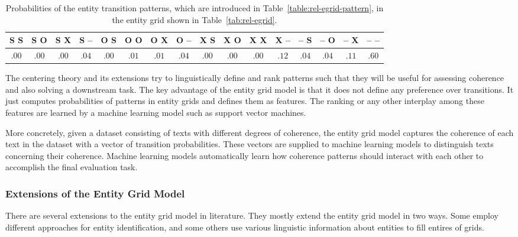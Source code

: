 \begin{table}
	\begin{center}
		\resizebox{\columnwidth}{!}
		{%
			\begin{tabular}{@{}cccccccccccccccc@{}}
				\toprule
				S S & S O & S X & S -- & O S & O O & O X & O -- & X S & X O & X X & X -- & -- S & -- O & -- X & -- -- \\
				\midrule
				$.00$ & $.00$ & $.00$ & $.04$ & $.00$ & $.01$ & $.01$ & $.04$ & $.00$ & $.00$ & $.00$ & $.12$ & $.04$ & $.04$ & $.11$ & $.60$ \\
				\bottomrule
			\end{tabular}
		}%
	\end{center}
	\caption{
	Probabilities of the entity transition patterns, which are introduced in Table~\ref{table:rel-egrid-pattern}, in the entity grid shown in Table~\ref{tab:rel-egrid}.
	}
	\label{tab:rel-egrid-probs}
\end{table}

The centering theory and its extensions try to linguistically define and rank patterns such that they will be useful for assessing coherence and also solving a downstream task.  
The key advantage of the entity grid model is that it does not define any preference over transitions. 
It just computes probabilities of patterns in entity grids and defines them as features. 
The ranking or any other interplay among these features are learned by a machine learning model such as support vector machines. 

More concretely, given a dataset consisting of texts with different degrees of coherence, the entity grid model captures the coherence of each text in the dataset with a vector of transition probabilities. 
These vectors are supplied to machine learning models to distinguish texts concerning their coherence.  
Machine learning models automatically learn how coherence patterns should interact with each other to accomplish the final evaluation task.  

\subsubsection{Extensions of the Entity Grid Model}
%
There are several extensions to the entity grid model in literature.  
They mostly extend the entity grid model in two ways. 
Some employ different approaches for entity identification, and some others use various linguistic information about entities to fill entires of grids. 

